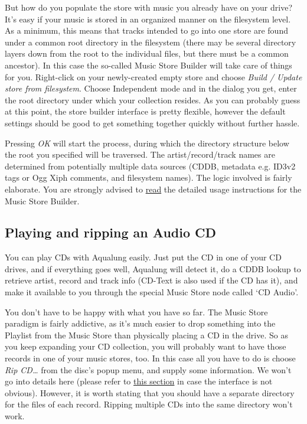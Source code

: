 \documentclass[10pt,english]{article}
\begin{document}
But how do you populate the store with music you already
have on your drive? It's easy if your music is stored in an
organized manner on the filesystem level. As a minimum, this
means that tracks intended to go into one store are found
under a common root directory in the filesystem (there may be
several directory layers down from the root to the individual
files, but there must be a common ancestor). In this case the
so-called Music Store Builder will take care of things for
you. Right-click on your newly-created empty store and choose
\textsl{Build / Update store from filesystem}. Choose
Independent mode and in the dialog you get, enter the root
directory under which your collection resides. As you can
probably guess at this point, the store builder interface is
pretty flexible, however the default settings should be good
to get something together quickly without further hassle.




Pressing \textsl{OK} will start the process, during which
the directory structure below the root you specified will be
traversed. The artist/record/track names are determined from
potentially multiple data sources (CDDB, metadata e.g. ID3v2
tags or Ogg Xiph comments, and filesystem names). The logic
involved is fairly elaborate. You are strongly advised to \hyperref[idp663728]{\color{blue}read} the detailed usage instructions
for the Music Store Builder.




\subsection{Playing and ripping an Audio CD\label{idp343536}}



\noindent You can play CDs with Aqualung easily. Just put the CD in
one of your CD drives, and if everything goes well, Aqualung
will detect it, do a CDDB lookup to retrieve artist, record
and track info (CD-Text is also used if the CD has it), and
make it available to you through the special Music Store node
called `CD Audio'.




You don't have to be happy with what you have so far. The
Music Store paradigm is fairly addictive, as it's much easier
to drop something into the Playlist from the Music Store than
physically placing a CD in the drive. So as you keep expanding
your CD collection, you will probably want to have those
records in one of your music stores, too. In this case all you
have to do is choose \textsl{Rip CD\dots{}} from the disc's
popup menu, and supply some information. We won't go into
details here (please refer to \hyperref[idp589520]{\color{blue}this
section} in case the interface is not obvious). However,
it is worth stating that you should have a separate directory
for the files of each record. Ripping multiple CDs into the
same directory won't work.
\end{document}
